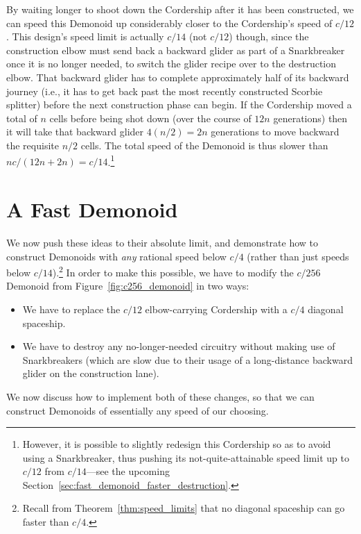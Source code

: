 By waiting longer to shoot down the Cordership after it has been constructed, we can speed this Demonoid up considerably closer to the Cordership's speed of $c/12$. This design's speed limit is actually $c/14$ (not $c/12$) though, since the construction elbow must send back a backward glider as part of a Snarkbreaker once it is no longer needed, to switch the glider recipe over to the destruction elbow. That backward glider has to complete approximately half of its backward journey (i.e., it has to get back past the most recently constructed Scorbie splitter) before the next construction phase can begin. If the Cordership moved a total of $n$ cells before being shot down (over the course of $12n$ generations) then it will take that backward glider $4(n/2) = 2n$ generations to move backward the requisite $n/2$ cells. The total speed of the Demonoid is thus slower than $nc/(12n + 2n) = c/14$.\footnote{However, it is possible to slightly redesign this Cordership so as to avoid using a Snarkbreaker, thus pushing its not-quite-attainable speed limit up to $c/12$ from $c/14$---see the upcoming Section~\ref{sec:fast_demonoid_faster_destruction}.}


\section{A Fast Demonoid}\label{sec:fast_demonoid}

We now push these ideas to their absolute limit, and demonstrate how to construct Demonoids with \emph{any} rational speed below $c/4$ (rather than just speeds below $c/14$).\footnote{Recall from Theorem~\ref{thm:speed_limits} that no diagonal spaceship can go faster than $c/4$.} In order to make this possible, we have to modify the $c/256$ Demonoid from Figure~\ref{fig:c256_demonoid} in two ways:\smallskip

\begin{itemize}
	\item We have to replace the $c/12$ elbow-carrying Cordership with a $c/4$ diagonal spaceship.\smallskip
	
	\item We have to destroy any no-longer-needed circuitry without making use of Snarkbreakers (which are slow due to their usage of a long-distance backward glider on the construction lane).\smallskip
\end{itemize}

We now discuss how to implement both of these changes, so that we can construct Demonoids of essentially any speed of our choosing.


